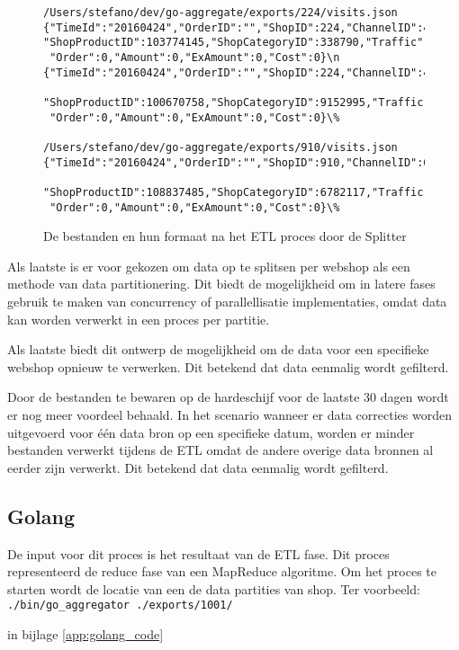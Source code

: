 \begin{figure}[htb]
\caption{De bestanden en hun formaat na het ETL proces door de Splitter}
\label{fig:visits.json_after_etl}
\begin{verbatim}
/Users/stefano/dev/go-aggregate/exports/224/visits.json
{"TimeId":"20160424","OrderID":"","ShopID":224,"ChannelID":410,
"ShopProductID":103774145,"ShopCategoryID":338790,"Traffic":1,
 "Order":0,"Amount":0,"ExAmount":0,"Cost":0}\n
{"TimeId":"20160424","OrderID":"","ShopID":224,"ChannelID":410,
 "ShopProductID":100670758,"ShopCategoryID":9152995,"Traffic":1,
 "Order":0,"Amount":0,"ExAmount":0,"Cost":0}\%
    
/Users/stefano/dev/go-aggregate/exports/910/visits.json
{"TimeId":"20160424","OrderID":"","ShopID":910,"ChannelID":61,
 "ShopProductID":108837485,"ShopCategoryID":6782117,"Traffic":1,
 "Order":0,"Amount":0,"ExAmount":0,"Cost":0}\%
\end{verbatim}
\end{figure}

Als laatste is er voor gekozen om data op te splitsen per webshop als een methode van data partitionering. Dit biedt de mogelijkheid om in latere fases gebruik te maken van concurrency of parallellisatie implementaties, omdat data kan worden verwerkt in een proces per partitie.

Als laatste biedt dit ontwerp de mogelijkheid om de data voor een specifieke webshop opnieuw te verwerken. Dit betekend dat data eenmalig wordt gefilterd. 

Door de bestanden te bewaren op de hardeschijf voor de laatste 30 dagen wordt er nog meer voordeel behaald.
In het scenario wanneer er data correcties worden uitgevoerd voor één data bron op een specifieke datum, worden er minder bestanden verwerkt tijdens de ETL omdat de andere overige data bronnen al eerder zijn verwerkt. Dit betekend dat data eenmalig wordt gefilterd.

\subsection{Golang}

De input voor dit proces is het resultaat van de ETL fase. Dit proces representeerd de reduce fase van een MapReduce algoritme. Om het proces te starten wordt de locatie van een de data partities van shop. Ter voorbeeld: \newline\verb+./bin/go_aggregator ./exports/1001/+

in bijlage \ref{app:golang_code}


